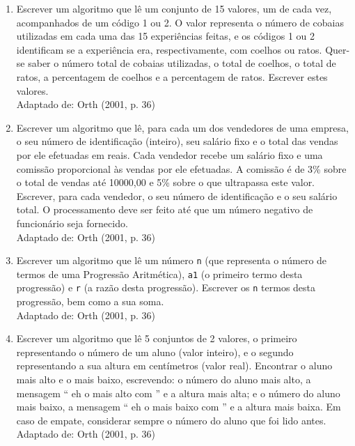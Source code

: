 \documentclass[onecolumn,a4paper,10pt]{report}
\newcommand{\+}{\, + \,}
\newcommand{\<}{\hspace*{-0.4cm}}
\begin{document}
\begin{enumerate}[1.]
\item Escrever um algoritmo que lê um conjunto de 15 valores, um de cada vez, acompanhados de um código 1 ou 2. O valor representa o número de cobaias utilizadas em cada uma das 15 experiências feitas, e os códigos 1 ou 2 identificam se a experiência era, respectivamente, com coelhos ou ratos. Quer-se saber o número total de cobaias utilizadas, o total de coelhos, o total de ratos, a percentagem de coelhos e a percentagem de ratos. Escrever estes valores.\\
{\tiny Adaptado de: Orth (2001, p. 36)}

\item Escrever um algoritmo que lê, para cada um dos vendedores de uma empresa, o seu número de identificação (inteiro), seu salário fixo e o total das vendas por ele efetuadas em reais. Cada vendedor recebe um salário fixo e uma comissão proporcional às vendas por ele efetuadas. A comissão é de 3\% sobre o total de vendas até 10000,00 e 5\% sobre o que ultrapassa este valor. Escrever, para cada vendedor, o seu número de identificação e o seu salário total. O processamento deve ser feito até que um número negativo de funcionário seja fornecido.\\
{\tiny Adaptado de: Orth (2001, p. 36)}

\item Escrever um algoritmo que lê um número \texttt{n} (que representa o número de termos de uma Progressão Aritmética), \texttt{a1} (o primeiro termo desta progressão) e \texttt{r} (a razão desta progressão). Escrever os \texttt{n} termos desta progressão, bem como a sua soma.\\
{\tiny Adaptado de: Orth (2001, p. 36)}

\item Escrever um algoritmo que lê 5 conjuntos de 2 valores, o primeiro representando o número de um aluno (valor inteiro), e o segundo representando a sua altura em centímetros (valor real). Encontrar o aluno mais alto e o mais baixo, escrevendo: o número do aluno mais alto, a mensagem `` eh o mais alto com '' e a altura mais alta; e o número do aluno mais baixo, a mensagem `` eh o mais baixo com '' e a altura mais baixa. Em caso de empate, considerar sempre o número do aluno que foi lido antes.\\
{\tiny Adaptado de: Orth (2001, p. 36)}


\end{enumerate}
\end{document}
